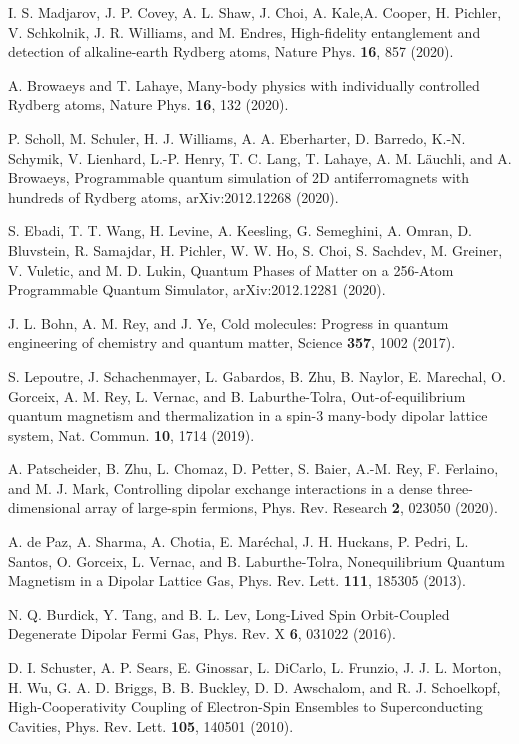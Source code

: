 \documentclass[pra,twocolumn,showpacs,preprintnumbers,amsmath,amssymb,superscriptaddress]{revtex4-1}
\begin{document}
\begin{thebibliography}{99}
 I.  S.  Madjarov,  J.  P.  Covey,  A.  L.  Shaw,  J.  Choi,  A.  Kale,A. Cooper, H. Pichler, V. Schkolnik, J. R. Williams,  and M. Endres, High-fidelity entanglement and detection of alkaline-earth Rydberg atoms, Nature Phys. {\bf 16}, 857 (2020).
	
 A. Browaeys and T. Lahaye, Many-body physics with individually controlled Rydberg atoms, Nature Phys. {\bf 16}, 132 (2020).
    
 P. Scholl, M. Schuler, H. J. Williams, A. A. Eberharter, D. Barredo, K.-N. Schymik, V. Lienhard, L.-P. Henry, T. C. Lang, T. Lahaye, A. M. L\"auchli, and A. Browaeys, Programmable quantum simulation of 2D antiferromagnets with hundreds of Rydberg atoms,  arXiv:2012.12268 (2020).
    
    S. Ebadi, T. T. Wang, H. Levine, A. Keesling, G. Semeghini, A. Omran, D. Bluvstein, R. Samajdar, H. Pichler, W. W. Ho, S. Choi, S. Sachdev, M. Greiner, V. Vuletic, and M. D. Lukin, Quantum Phases of Matter on a 256-Atom Programmable Quantum Simulator, arXiv:2012.12281 (2020). 
  
 J. L. Bohn, A. M. Rey, and J. Ye, Cold molecules: Progress in quantum engineering of chemistry and quantum matter, Science {\bf 357}, 1002 (2017).
  
 S. Lepoutre, J. Schachenmayer, L. Gabardos, B. Zhu, B. Naylor, E. Marechal, O. Gorceix, A. M. Rey, L. Vernac, and  B. Laburthe-Tolra, Out-of-equilibrium quantum magnetism and thermalization in a spin-3 many-body dipolar lattice system, Nat. Commun. {\bf 10}, 1714 (2019).
  
  A. Patscheider, B. Zhu, L. Chomaz, D. Petter, S. Baier, A.-M. Rey, F. Ferlaino, and M. J. Mark, Controlling dipolar exchange interactions in a dense three-dimensional array of large-spin fermions, Phys. Rev. Research {\bf 2}, 023050 (2020).
 
  A. de Paz, A. Sharma, A. Chotia, E. Mar\'echal, J. H. Huckans, P. Pedri, L. Santos, O. Gorceix, L. Vernac, and B. Laburthe-Tolra, Nonequilibrium Quantum Magnetism in a Dipolar Lattice Gas, Phys. Rev. Lett. {\bf 111}, 185305 (2013).
 
  N. Q. Burdick, Y. Tang, and B. L. Lev, Long-Lived Spin Orbit-Coupled Degenerate Dipolar Fermi Gas, Phys. Rev. X {\bf 6}, 031022 (2016).
  
 D. I. Schuster,  A. P. Sears, E. Ginossar,    L.    DiCarlo,    L.    Frunzio,    J.    J.    L.    Morton,    H.    Wu,    G.    A.    D.    Briggs,    B.    B.    Buckley,    D.    D.    Awschalom,    and    R.    J.    Schoelkopf,    High-­Cooperativity    Coupling    of    Electron-­Spin    Ensembles    to    Superconducting    Cavities,    Phys.    Rev.    Lett.    {\bf 105},    140501    (2010).


\end{thebibliography}
\end{document}
